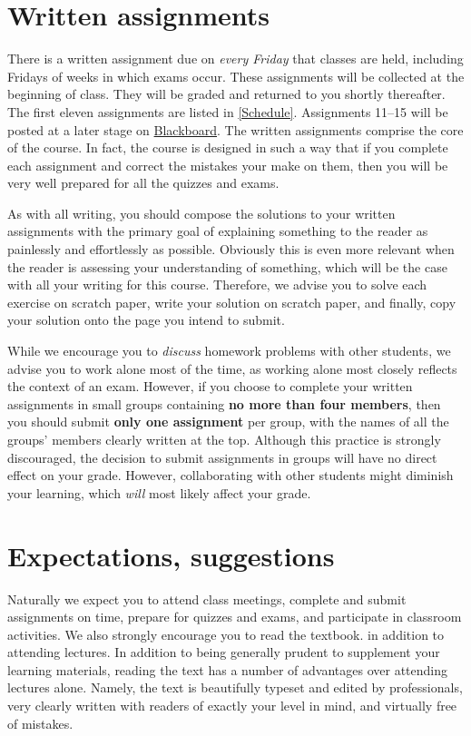 \documentclass[11pt]{article}
\begin{document}
\section{Written assignments}\label{Written}
There is a written assignment due on {\em every 
Friday} that classes are held, including Fridays of weeks
in which exams occur.
These assignments will be collected at the beginning
of class. They will be graded and returned to you shortly thereafter.
The first eleven assignments
are listed in \autoref{Schedule}. Assignments 11--15
will be posted at a later stage on \href{https://bb.its.iastate.edu}{Blackboard}.
The written assignments comprise the core of the course. In fact, the course is 
designed in such a way that if you complete each assignment and 
correct the mistakes your make on them,
then you will be very well prepared for all the quizzes and exams.

As with all writing, you should compose the solutions to your written
assignments with the primary goal of explaining something to the
reader as painlessly and effortlessly as possible. Obviously this
is even more relevant when the reader is assessing your understanding
of something, which will be the case with all your writing for this
course. Therefore, we advise you to solve each exercise on scratch
paper, write your solution on scratch paper, and finally, copy your
solution onto the page you intend to submit.

While we encourage you to {\em discuss} homework problems with other
students, we advise you to work alone most of the time,
as working alone most closely reflects the context of an exam.
However, if you choose to complete your written assignments in small
groups containing {\bf no more than four members}, then you should
submit {\bf only one assignment} per group, with the names of all
the groups' members clearly written at the top.  Although this
practice is strongly discouraged, the decision to submit assignments
in groups will have no direct effect on your grade. However,
collaborating with other students might diminish your learning,
which {\em will} most likely affect your grade.

\section{Expectations, suggestions} Naturally we expect you to attend 
class meetings, complete and submit assignments on 
time, prepare for quizzes and exams, and participate in classroom 
activities. We also strongly encourage you to read the textbook.
in addition to attending lectures.
In addition to being generally prudent to 
supplement your learning materials, reading the text has a number of 
advantages over attending lectures alone. Namely, the text is beautifully 
typeset and edited by professionals, very clearly written with readers 
of exactly your level in mind, and virtually free of mistakes.
\end{document}
